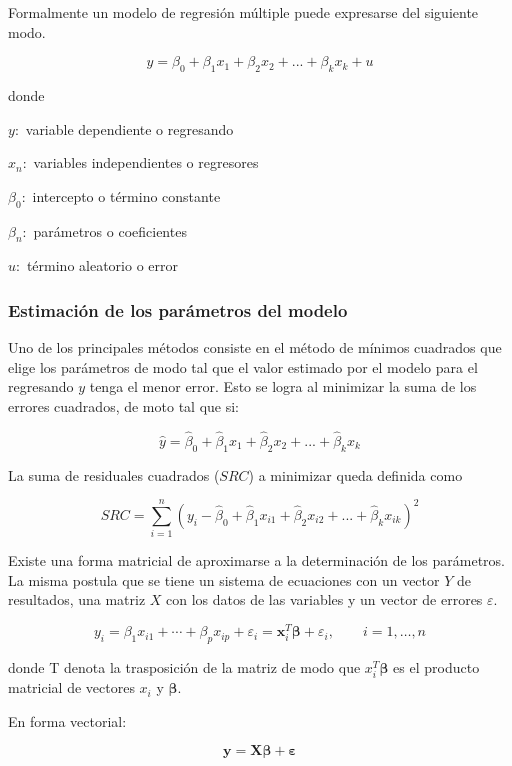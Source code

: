 Formalmente un modelo de regresión múltiple puede expresarse del siguiente modo.

$$y = \beta_0 + \beta_1 x_1 + \beta_2 x_2 + ... + \beta_k x_k + u$$

donde

$y:$ variable dependiente o regresando

$x_n:$ variables independientes o regresores

$\beta_0:$ intercepto o término constante 

$\beta_n:$ parámetros o coeficientes 

$u:$ término aleatorio o error


\subsubsection{Estimación de los parámetros del modelo} 

Uno de los principales métodos consiste en el método de mínimos cuadrados que elige los parámetros de modo tal que el valor estimado por el modelo para el regresando $y$ tenga el menor error. Esto se logra al minimizar la suma de los errores cuadrados, de moto tal que si:

$$\hat{y} = \hat{\beta}_0 + \hat{\beta}_1 x_1 + \hat{\beta}_2 x_2 + ... + \hat{\beta}_k x_k$$

La suma de residuales cuadrados ($SRC$) a minimizar queda definida como 

$$SRC = \sum_{i=1}^{n}(y_i - \hat{\beta}_0 + \hat{\beta}_1 x_{i1} + \hat{\beta}_2 x_{i2} + ... + \hat{\beta}_k x_{ik})^2$$

Existe una forma matricial de aproximarse a la determinación de los parámetros. La misma postula que se tiene un sistema de ecuaciones con un vector $Y$ de resultados, una matriz $X$ con los datos de las variables y un vector de errores $\varepsilon$. 

$$y_{i}=\beta _{1}x_{i1}+\cdots +\beta _{p}x_{ip}+\varepsilon _{i}=\mathbf {x} _{i}^{T}{\boldsymbol {\beta }}+\varepsilon _{i},\qquad i=1,\ldots,n$$

donde T denota la trasposición de la matriz de modo que ${x}_{i}^{T} \boldsymbol {\beta}$ es el producto matricial de vectores $x_i$ y $\boldsymbol {\beta }$.

En forma vectorial:

$$\mathbf {y} =\mathbf {X} {\boldsymbol {\beta }}+{\boldsymbol {\varepsilon }}$$


